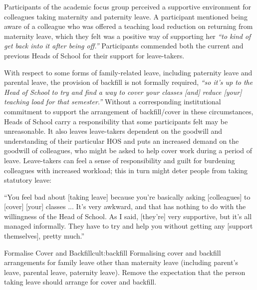 Participants  of the academic focus group perceived a supportive environment for colleagues taking maternity and paternity leave. A participant mentioned being aware of a colleague who was offered a teaching load reduction on returning from maternity leave, which they felt was a positive way of supporting her \textit{``to kind of get back into it after being off.''}   Participants commended both the current and previous Heads of School for their support for leave-takers. %

With respect to some forms of family-related leave, including paternity leave and parental leave, the provision of backfill is not formally required, \textit{``so it's up to the Head of School to try and find a way to cover your classes [and] reduce [your] teaching load for that semester.''}   
Without a corresponding institutional commitment to support the arrangement of backfill/cover in these circumstances, Heads of School carry a responsibility that some participants felt may be unreasonable.  It also leaves leave-takers dependent on the goodwill and understanding of their particular \ac{HOS} and puts an increased demand on the goodwill of colleagues, who might be asked to help cover work during a period of leave.  
Leave-takers can feel a sense of responsibility and guilt for burdening colleagues with increased workload; this in turn might deter people from taking statutory leave:    


\begin{myquote}
“You feel bad about [taking leave] because you're basically asking [colleagues] to [cover] [your] classes ... It's very awkward, and that has nothing to do with the willingness of the Head of School. As I said, [they’re] very supportive, but it's all managed informally. They have to try and help you without getting any [support themselves], pretty much.”  
\end{myquote}

\newcommand{\actcultbackfill}{Formalising cover and backfill arrangements for family leave other than maternity leave (including parent’s leave, parental leave, paternity leave). Remove the expectation that the person taking leave should arrange for cover and backfill.}
\begin{actionblock}{\ksspace{}Formalise Cover and Backfill}{cult:backfill}
\actcultbackfill
\hfill{
    \hypersetup{hidelinks}
    \hyperlink{e4}{\gotoactionsymbol{}}
}
\end{actionblock}



